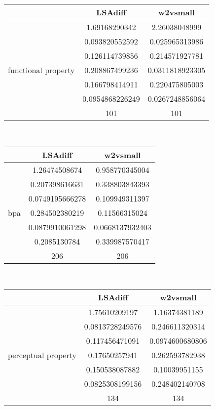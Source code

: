 \documentclass{article}
\begin{document}
\begin{tabular}{ccc|}\cline{2-3}
&\multicolumn{1}{|c}{LSAdiff} & w2vsmall \\\hline
\multicolumn{1}{|c|}{\multirow{7}{*}{functional property}} & 1.69168290342 & 2.26038048999 \\
\multicolumn{1}{|c|}{} & 0.093820552592 & 0.025965313986 \\
\multicolumn{1}{|c|}{} & 0.126114739856 & 0.214571927781 \\
\multicolumn{1}{|c|}{} & 0.208867499236 & 0.0311818923305 \\
\multicolumn{1}{|c|}{} & 0.166798414911 & 0.220475805003 \\
\multicolumn{1}{|c|}{} & 0.0954868226249 & 0.0267248856064 \\
\multicolumn{1}{|c|}{} & 101 & 101 \\
\hline
\end{tabular}\\
\begin{tabular}{ccc|}\cline{2-3}
&\multicolumn{1}{|c}{LSAdiff} & w2vsmall \\\hline
\multicolumn{1}{|c|}{\multirow{7}{*}{bpa}} & 1.26474508674 & 0.958770345004 \\
\multicolumn{1}{|c|}{} & 0.207398616631 & 0.338803843393 \\
\multicolumn{1}{|c|}{} & 0.0749195666278 & 0.109949311397 \\
\multicolumn{1}{|c|}{} & 0.284502380219 & 0.11566315024 \\
\multicolumn{1}{|c|}{} & 0.0879910061298 & 0.0668137932403 \\
\multicolumn{1}{|c|}{} & 0.2085130784 & 0.339987570417 \\
\multicolumn{1}{|c|}{} & 206 & 206 \\
\hline
\end{tabular}\\
\begin{tabular}{ccc|}\cline{2-3}
&\multicolumn{1}{|c}{LSAdiff} & w2vsmall \\\hline
\multicolumn{1}{|c|}{\multirow{7}{*}{perceptual property}} & 1.75610209197 & 1.16374381189 \\
\multicolumn{1}{|c|}{} & 0.0813728249576 & 0.246611320314 \\
\multicolumn{1}{|c|}{} & 0.117456471091 & 0.0974600680806 \\
\multicolumn{1}{|c|}{} & 0.17650257941 & 0.262593782938 \\
\multicolumn{1}{|c|}{} & 0.150538087882 & 0.10039951155 \\
\multicolumn{1}{|c|}{} & 0.0825308199156 & 0.248402140708 \\
\multicolumn{1}{|c|}{} & 134 & 134 \\
\hline
\end{tabular}\\
\end{document}
